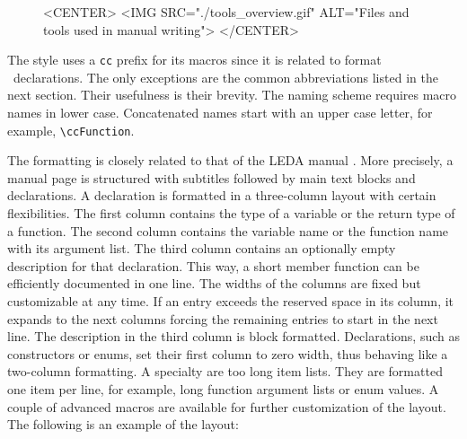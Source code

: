 \documentclass[11pt]{article}
\makeatletter
\newcommand{\TTindex}[1]{\index{#1@{\tt #1}}}
\newcommand{\Dindex}[1]{#1\index{#1}}
\makeatother
\begin{document}
\def\figuretopindent{\vspace{2ex}}

\begin{figure}
    \label{ToolsOverviewFig}\figuretopindent
\begin{ccHtmlOnly}
<CENTER>
  <IMG SRC="./tools_overview.gif" ALT="Files and tools used in manual writing">
</CENTER>
\end{ccHtmlOnly}
\end{figure}

 The style uses a {\tt cc} prefix for its macros since it is related to format \CC\ 
declarations. The only exceptions are the common abbreviations listed
in the next section. Their usefulness is their brevity. The naming
scheme requires macro names in lower case.  Concatenated names start
with an upper case letter, for example, \verb+\ccFunction+.

 The formatting is closely related to that of the
LEDA\TTindex{LEDA} manual \cite{Naeher95}.  More precisely, a manual
page is structured with subtitles followed by main text blocks and
declarations. A declaration is formatted in a \Dindex{three-column
  layout} with certain flexibilities.  The first column contains the
type of a variable or the return type of a function. The second column
contains the variable name or the function name with its argument
list. The third column contains an optionally empty description for
that declaration. This way, a short member function can be efficiently
documented in one line. The widths of the columns are fixed but
customizable at any time. If an entry exceeds the reserved space in
its column, it expands to the next columns forcing the remaining
entries to start in the next line. The description in the third column
is block formatted.  Declarations, such as constructors or enums, set
their first column to zero width, thus behaving like a two-column
formatting.  A specialty are too long \Dindex{item lists}.  They are
formatted one item per line, for example, long function argument lists
or enum values. A couple of advanced macros are available for further
customization of the layout. The following is an example of the
layout: 
\end{document}
